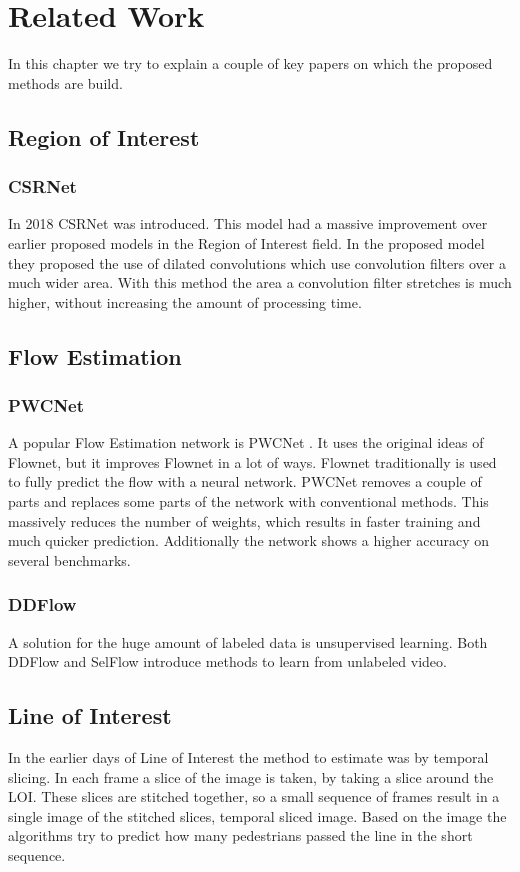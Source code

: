 \chapter{Related Work}
In this chapter we try to explain a couple of key papers on which the proposed methods are build.

\section{Region of Interest}
\subsection{CSRNet}
In 2018 CSRNet \cite{li2018csrnet} was introduced. This model had a massive improvement over earlier proposed models in the Region of Interest field. In the proposed model they proposed the use of dilated convolutions which use convolution filters over a much wider area. With this method the area a convolution filter stretches is much higher, without increasing the amount of processing time.
\section{Flow Estimation}

\subsection{PWCNet}
A popular Flow Estimation network is PWCNet \cite{sun_pwc-net_2018}. It uses the original ideas of Flownet, but it improves Flownet in a lot of ways. Flownet traditionally is used to fully predict the flow with a neural network. PWCNet removes a couple of parts and replaces some parts of the network with conventional methods. This massively reduces the number of weights, which results in faster training and much quicker prediction. Additionally the network shows a higher accuracy on several benchmarks.

\subsection{DDFlow}
A solution for the huge amount of labeled data is unsupervised learning. Both DDFlow \cite{liu_ddflow_2019} and SelFlow \cite{liu_selflow_2019} introduce methods to learn from unlabeled video.

\section{Line of Interest}
In the earlier days of Line of Interest the method to estimate was by temporal slicing. In each frame a slice of the image is taken, by taking a slice around the LOI. These slices are stitched together, so a small sequence of frames result in a single image of the stitched slices, temporal sliced image. Based on the image the algorithms try to predict how many pedestrians passed the line in the short sequence.

